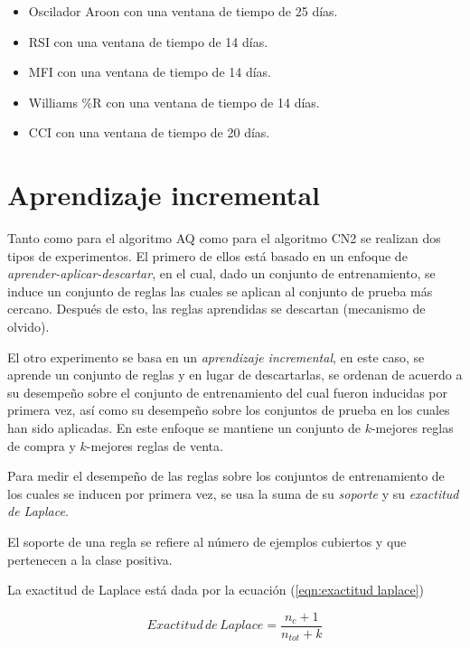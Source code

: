 \documentclass[12pt]{report}
\theoremstyle{break}
\theoremstyle{break}
\begin{document}
\begin{itemize}
\item Oscilador Aroon con una ventana de tiempo de 25 días.

\item RSI con una ventana de tiempo de 14 días.

\item MFI con una ventana de tiempo de 14 días.

\item Williams \%R con una ventana de tiempo de 14 días.

\item CCI con una ventana de tiempo de 20 días.
\end{itemize}


\section{Aprendizaje incremental}
\label{seccion:aprendizaje incremental}
Tanto como para el algoritmo AQ como para el algoritmo CN2 se realizan dos tipos de experimentos. El primero de ellos está basado en un enfoque de \textit{aprender-aplicar-descartar}, en el cual, dado un conjunto de entrenamiento, se induce un conjunto de reglas las cuales se aplican al conjunto de prueba más cercano. Después de esto, las reglas aprendidas se descartan (mecanismo de olvido).

El otro experimento se basa en un \textit{aprendizaje incremental}, en este caso, se aprende un conjunto de reglas y en lugar de descartarlas, se ordenan de acuerdo a su desempeño sobre el conjunto de entrenamiento del cual fueron inducidas por primera vez, así como su desempeño sobre los conjuntos de prueba en los cuales han sido aplicadas. En este enfoque se mantiene un conjunto de $k$-mejores reglas de compra y $k$-mejores reglas de venta.

Para medir el desempeño de las reglas sobre los conjuntos de entrenamiento de los cuales se inducen por primera vez, se usa la suma de su \textit{soporte} y su \textit{exactitud de Laplace}.

El soporte de una regla se refiere al número de ejemplos cubiertos y que pertenecen a la clase positiva.

La exactitud de Laplace está dada por la ecuación (\ref{eqn:exactitud laplace})

\begin{equation}\label{eqn:exactitud laplace}
Exactitud\,de\,Laplace = \dfrac{ n_{c} + 1 }{ n_{tot} + k }
\end{equation}
\end{document}

